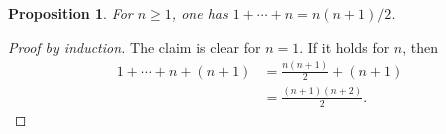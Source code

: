 \documentclass{article}
\newtheorem{proposition}{Proposition}
\begin{document}
\begin{proposition}
For $n\ge1$, one has $1+\cdots+n=n(n+1)/2$.
\end{proposition}
\begin{proof}[Proof by induction]
The claim is clear for $n=1$. If it holds for $n$, then
\begin{align*}
  1+\cdots+n+(n+1)
    &= \frac{n(n+1)}2+(n+1) \\
    &= \frac{(n+1)(n+2)}2.
\end{align*}
\end{proof}
\end{document}

